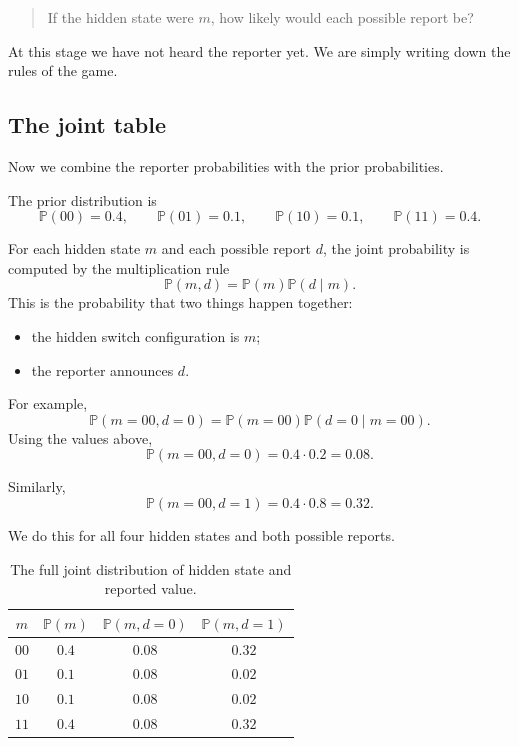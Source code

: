 \documentclass[11pt]{article}
\begin{document}
\begin{quote}
    If the hidden state were \(m\), how likely would each possible report be?
\end{quote}

At this stage we have not heard the reporter yet. We are simply writing down the rules of the game.

\subsection{The joint table}

Now we combine the reporter probabilities with the prior probabilities.

The prior distribution is
\[
    \mathbb{P}(00)=0.4,
    \qquad
    \mathbb{P}(01)=0.1,
    \qquad
    \mathbb{P}(10)=0.1,
    \qquad
    \mathbb{P}(11)=0.4.
\]

For each hidden state \(m\) and each possible report \(d\), the joint probability is computed by the multiplication rule
\[
    \mathbb{P}(m,d)
    =
    \mathbb{P}(m)\mathbb{P}(d\mid m).
\]
This is the probability that two things happen together:

\begin{itemize}[leftmargin=*]
    \item the hidden switch configuration is \(m\);
    \item the reporter announces \(d\).
\end{itemize}

For example,
\[
    \mathbb{P}(m=00,d=0)
    =
    \mathbb{P}(m=00)\mathbb{P}(d=0\mid m=00).
\]
Using the values above,
\[
    \mathbb{P}(m=00,d=0)
    =
    0.4\cdot 0.2
    =
    0.08.
\]

Similarly,
\[
    \mathbb{P}(m=00,d=1)
    =
    0.4\cdot 0.8
    =
    0.32.
\]

We do this for all four hidden states and both possible reports.

\begin{table}[h]
\centering
\begin{tabular}{c c c c}
\toprule
\(m\) & \(\mathbb{P}(m)\) & \(\mathbb{P}(m,d=0)\) & \(\mathbb{P}(m,d=1)\) \\
\midrule
\(00\) & \(0.4\) & \(0.08\) & \(0.32\) \\
\(01\) & \(0.1\) & \(0.08\) & \(0.02\) \\
\(10\) & \(0.1\) & \(0.08\) & \(0.02\) \\
\(11\) & \(0.4\) & \(0.08\) & \(0.32\) \\
\bottomrule
\end{tabular}
\caption{The full joint distribution of hidden state and reported value.}
\label{tab:joint-distribution}
\end{table}
\end{document}

